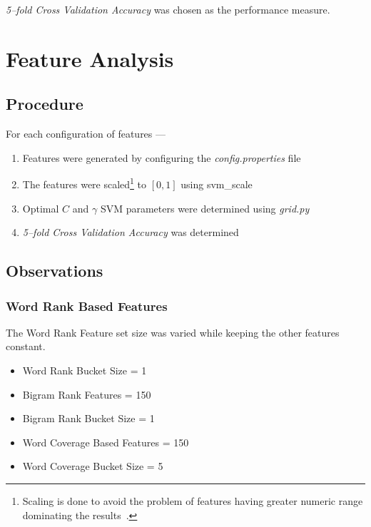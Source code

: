 \documentclass[a4paper,10pt]{report}
\begin{document}
\noindent \emph{5--fold Cross Validation Accuracy} was chosen as the performance measure.
\clearpage
\section{Feature Analysis}

\subsection{Procedure}

For each configuration of features ---
\begin{enumerate}
    \item Features were generated by configuring the \emph{config.properties} file
    \item The features were scaled\footnote{Scaling is done to avoid the problem of features having greater numeric range dominating the results~\cite{libsvmppt}.} to $[0,1]$ using svm\_scale
    \item Optimal $C$ and $\gamma$ SVM parameters were determined using \emph{grid.py}
    \item \emph{5--fold Cross Validation Accuracy} was determined
\end{enumerate}
\clearpage
\subsection{Observations}

\subsubsection{Word Rank Based Features}

The Word Rank Feature set size was varied while keeping the other features constant.

\begin{itemize}
\item Word Rank Bucket Size = 1
\item Bigram Rank Features = 150
\item Bigram Rank Bucket Size = 1
\item Word Coverage Based Features = 150
\item Word Coverage Bucket Size = 5
\end{itemize}
\end{document}

